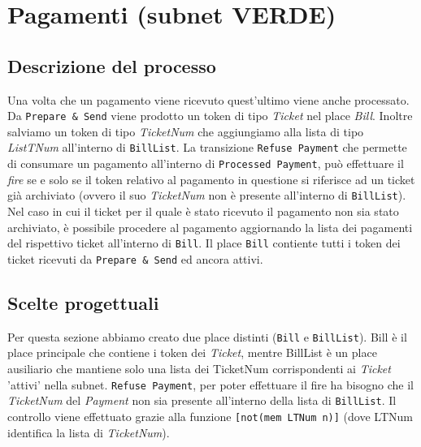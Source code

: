 \documentclass[../Relazione.tex]{subfiles}
\begin{document}
\section{Pagamenti \small(subnet \textcolor{PineGreen}{VERDE})}
    
    \subsection{Descrizione del processo}
        Una volta che un pagamento viene ricevuto quest'ultimo viene anche processato.
        Da \texttt{Prepare \& Send} viene prodotto un token di tipo \textit{Ticket} nel place \textit{Bill}. Inoltre salviamo un token di tipo \textit{TicketNum} che aggiungiamo alla lista di tipo \textit{ListTNum} all'interno di \texttt{BillList}. La transizione \texttt{Refuse Payment} che permette di consumare un pagamento all'interno di \texttt{Processed Payment}, può effettuare il \textit{fire} se e solo se il token relativo al pagamento in questione si riferisce ad un ticket già archiviato (ovvero il suo \textit{TicketNum} non è presente all'interno di \texttt{BillList}). Nel caso in cui il ticket per il quale è stato ricevuto il pagamento non sia stato archiviato, è possibile procedere al pagamento aggiornando la lista dei pagamenti del rispettivo ticket all'interno di \texttt{Bill}. Il place \texttt{Bill} contiente tutti i token dei ticket ricevuti da \texttt{Prepare \& Send} ed ancora attivi.
        
    \subsection{Scelte progettuali}
        Per questa sezione abbiamo creato due place distinti (\texttt{Bill} e \texttt{BillList}). Bill è il place principale che contiene i token dei \textit{Ticket}, mentre BillList è un place ausiliario che mantiene solo una lista dei TicketNum corrispondenti ai \textit{Ticket} 'attivi' nella subnet. \texttt{Refuse Payment}, per poter effettuare il fire ha bisogno che il \textit{TicketNum} del \textit{Payment} non sia presente all'interno della lista di \texttt{BillList}. Il controllo viene effettuato grazie alla funzione \texttt{[not(mem LTNum n)]} (dove LTNum identifica la lista di \textit{TicketNum}).
        
        
\end{document}
